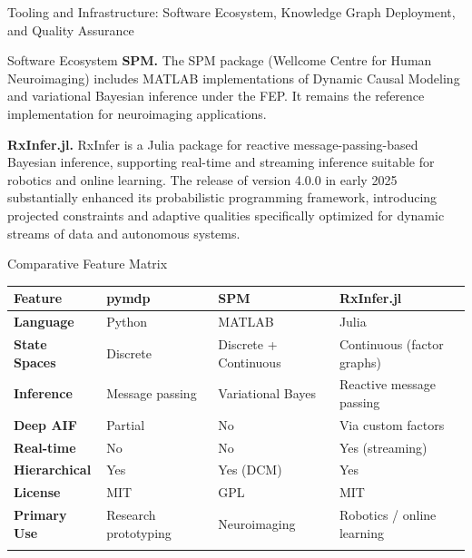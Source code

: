 \documentclass[
  ignorenonframetext,
]{beamer}
\newcounter{none} %
\begin{document}
\begin{frame}[fragile]{Tooling and Infrastructure: Software Ecosystem,
Knowledge Graph Deployment, and Quality Assurance \label{sec:tooling}}
\begin{block}{Software Ecosystem}
\textbf{SPM.} The SPM package (Wellcome Centre for Human Neuroimaging)
includes MATLAB implementations of Dynamic Causal Modeling and
variational Bayesian inference under the FEP. It remains the reference
implementation for neuroimaging applications.

\textbf{RxInfer.jl.} RxInfer is a Julia package for reactive
message-passing-based Bayesian inference, supporting real-time and
streaming inference suitable for robotics and online learning. The
release of version 4.0.0 in early 2025 \citep{rxinfer2025} substantially
enhanced its probabilistic programming framework, introducing projected
constraints and adaptive qualities specifically optimized for dynamic
streams of data and autonomous systems.

\begin{block}{Comparative Feature Matrix}
\protect{}\label{comparative-feature-matrix}
{\def\LTcaptype{none} %
\begin{longtable}[]{@{}
  >{\raggedright\arraybackslash}p{}
  >{\raggedright\arraybackslash}p{}
  >{\raggedright\arraybackslash}p{}
  >{\raggedright\arraybackslash}p{}@{}}
\toprule\noalign{}
\begin{minipage}[b]{\linewidth}\raggedright
Feature
\end{minipage} & \begin{minipage}[b]{\linewidth}\raggedright
pymdp
\end{minipage} & \begin{minipage}[b]{\linewidth}\raggedright
SPM
\end{minipage} & \begin{minipage}[b]{\linewidth}\raggedright
RxInfer.jl
\end{minipage} \\
\midrule\noalign{}
\endhead
\textbf{Language} & Python & MATLAB & Julia \\
\textbf{State Spaces} & Discrete & Discrete + Continuous & Continuous
(factor graphs) \\
\textbf{Inference} & Message passing & Variational Bayes & Reactive
message passing \\
\textbf{Deep AIF} & Partial & No & Via custom factors \\
\textbf{Real-time} & No & No & Yes (streaming) \\
\textbf{Hierarchical} & Yes & Yes (DCM) & Yes \\
\textbf{License} & MIT & GPL & MIT \\
\textbf{Primary Use} & Research prototyping & Neuroimaging & Robotics /
online learning \\
\bottomrule\noalign{}
\end{longtable}
}


\end{block}
\end{block}
\end{frame}
\end{document}
